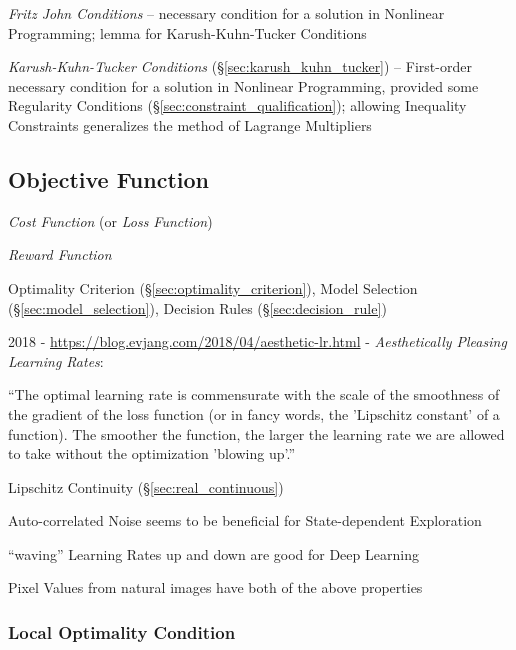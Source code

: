 \emph{Fritz John Conditions} -- necessary condition for a solution in Nonlinear
Programming; lemma for Karush-Kuhn-Tucker Conditions

\emph{Karush-Kuhn-Tucker Conditions} (\S\ref{sec:karush_kuhn_tucker}) --
First-order necessary condition for a solution in Nonlinear Programming,
provided some Regularity Conditions (\S\ref{sec:constraint_qualification});
allowing Inequality Constraints generalizes the method of Lagrange Multipliers



\subsection{Objective Function}\label{sec:objective_function}

\emph{Cost Function} (or \emph{Loss Function})

\emph{Reward Function}

\fist Optimality Criterion (\S\ref{sec:optimality_criterion}), Model Selection
(\S\ref{sec:model_selection}), Decision Rules (\S\ref{sec:decision_rule})

2018 - \url{https://blog.evjang.com/2018/04/aesthetic-lr.html} - \emph{Aesthetically
  Pleasing Learning Rates}:

``The optimal learning rate is commensurate with the scale of the smoothness of
the gradient of the loss function (or in fancy words, the 'Lipschitz constant'
of a function). The smoother the function, the larger the learning rate we are
allowed to take without the optimization 'blowing up'.''

\fist Lipschitz Continuity (\S\ref{sec:real_continuous})

Auto-correlated Noise seems to be beneficial for State-dependent Exploration

``waving'' Learning Rates up and down are good for Deep Learning

Pixel Values from natural images have both of the above properties



\subsubsection{Local Optimality Condition}\label{sec:local_optimality}


